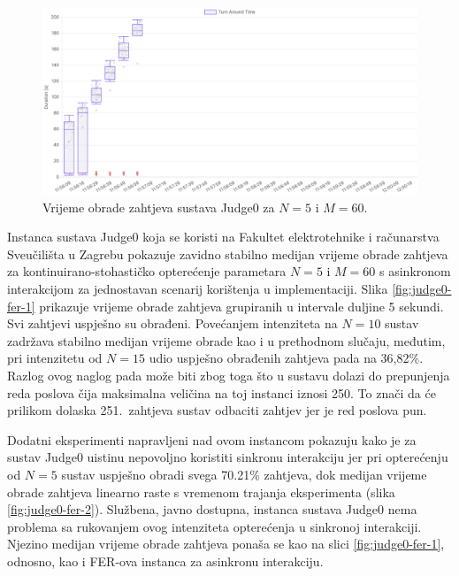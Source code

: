 \documentclass[times, utf8, diplomski]{fer}
\begin{document}
\begin{figure}[htb]
	\centering
	\includegraphics[width=\textwidth]{images/Judge0 TAT for 5 10s.png}
	\caption{
		Vrijeme obrade zahtjeva sustava Judge0 za $N=5$ i $M=60$.
	}
	\label{fig:judge0-2}
\end{figure}

Instanca sustava Judge0 koja se koristi na Fakultet elektrotehnike i računarstva Sveučilišta u Zagrebu pokazuje zavidno stabilno medijan vrijeme obrade zahtjeva za kontinuirano-stohastičko opterećenje parametara $N=5$ i $M=60$ s asinkronom interakcijom za jednostavan scenarij korištenja u  implementaciji. Slika \ref{fig:judge0-fer-1} prikazuje vrijeme obrade zahtjeva grupiranih u intervale duljine 5 sekundi. Svi zahtjevi uspješno su obrađeni. Povećanjem intenziteta na $N=10$ sustav zadržava stabilno medijan vrijeme obrade kao i u prethodnom slučaju, međutim, pri intenzitetu od $N=15$ udio uspješno obrađenih zahtjeva pada na 36,82\%. Razlog ovog naglog pada može biti zbog toga što u sustavu dolazi do prepunjenja reda poslova čija maksimalna veličina na toj instanci iznosi 250. To znači da će prilikom dolaska 251.\ zahtjeva sustav odbaciti zahtjev jer je red poslova pun.

Dodatni eksperimenti napravljeni nad ovom instancom pokazuju kako je za sustav Judge0 uistinu nepovoljno koristiti sinkronu interakciju jer pri opterećenju od $N=5$ sustav uspješno obradi svega 70.21\% zahtjeva, dok medijan vrijeme obrade zahtjeva linearno raste s vremenom trajanja eksperimenta (slika \ref{fig:judge0-fer-2}). Službena, javno dostupna, instanca sustava Judge0 \citep{Judge0CE} nema problema sa rukovanjem ovog intenziteta opterećenja u sinkronoj interakciji. Njezino medijan vrijeme obrade zahtjeva ponaša se kao na slici \ref{fig:judge0-fer-1}, odnosno, kao i FER-ova instanca za asinkronu interakciju.

\pagebreak
\end{document}
